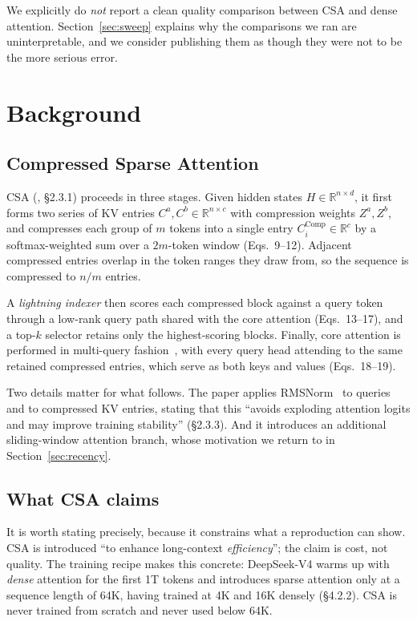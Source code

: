\documentclass[11pt]{article}
\begin{document}
We explicitly do \emph{not} report a clean quality comparison between CSA and
dense attention. Section~\ref{sec:sweep} explains why the comparisons we ran
are uninterpretable, and we consider publishing them as though they were not to
be the more serious error.

\section{Background}

\subsection{Compressed Sparse Attention}

CSA (\cite{deepseekv4}, \S2.3.1) proceeds in three stages. Given hidden states
$H \in \mathbb{R}^{n \times d}$, it first forms two series of KV entries
$C^a, C^b \in \mathbb{R}^{n \times c}$ with compression weights
$Z^a, Z^b$, and compresses each group of $m$ tokens into a single entry
$C^{\mathrm{Comp}}_i \in \mathbb{R}^{c}$ by a softmax-weighted sum over a
$2m$-token window (Eqs.~9--12). Adjacent compressed entries overlap in the
token ranges they draw from, so the sequence is compressed to $n/m$ entries.

A \emph{lightning indexer} then scores each compressed block against a query
token through a low-rank query path shared with the core attention (Eqs.~13--17),
and a top-$k$ selector retains only the highest-scoring blocks. Finally, core
attention is performed in multi-query fashion~\cite{shazeer2019mqa}, with every
query head attending to the same retained compressed entries, which serve as
both keys and values (Eqs.~18--19).

Two details matter for what follows. The paper applies
RMSNorm~\cite{zhang2019rmsnorm} to queries and to compressed KV entries,
stating that this ``avoids exploding attention logits and may improve training
stability'' (\S2.3.3). And it introduces an additional sliding-window attention
branch, whose motivation we return to in Section~\ref{sec:recency}.

\subsection{What CSA claims}

It is worth stating precisely, because it constrains what a reproduction can
show. CSA is introduced ``to enhance long-context \emph{efficiency}''; the
claim is cost, not quality. The training recipe makes this concrete: DeepSeek-V4
warms up with \emph{dense} attention for the first 1T tokens and introduces
sparse attention only at a sequence length of 64K, having trained at 4K and 16K
densely (\S4.2.2). CSA is never trained from scratch and never used below 64K.
\end{document}
